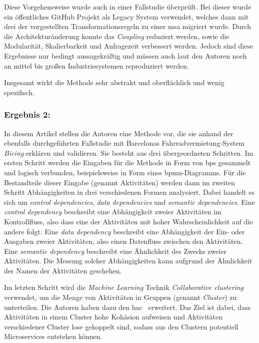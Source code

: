 Diese Vorgehensweise wurde auch in einer Fallstudie überprüft.
Bei dieser wurde ein öffentliches GitHub Projekt als Legacy System verwendet, welches dann mit drei der vorgestellten Transformationsregeln zu einer \gls{msa} migriert wurde.
Durch die Architekturänderung konnte das \emph{Coupling} reduziert werden, sowie die Modularität, Skalierbarkeit und Anfragezeit verbessert werden.
Jedoch sind diese Ergebnisse nur bedingt aussagekräftig und müssen auch laut den Autoren noch an mittel bis großen Industriesystemen reproduziert werden.

Insgesamt wirkt die Methode sehr abstrakt und oberflächlich und wenig spezifisch.

\subsubsection{Ergebnis 2:  \cite{arh-result-no-filter-3}}

In diesem Artikel stellen die Autoren eine Methode vor, die sie anhand der ebenfalls durchgeführten Fallstudie mit Barcelonas Fahrradvermietung-System \emph{Bicing} erklären und validieren.
Sie besteht aus drei übergeordneten Schritten.
Im ersten Schritt werden die Eingaben für die Methode in Form von \glspl{bp} gesammelt und logisch verbunden, beispielsweise in Form eines \gls{bpmn}-Diagramms.
Für die Bestandteile dieser Eingabe (genannt Aktivitäten) werden dann im zweiten Schritt Abhängigkeiten in drei verschiedenen Formen analysiert.
Dabei handelt es sich um \emph{control dependencies}, \emph{data dependencies} und \emph{semantic dependencies}.
Eine \emph{control dependency} beschreibt eine Abhängigkeit zweier Aktivitäten im Kontrollfluss, also dass eine der Aktivitäten mit hoher Wahrscheinlichkeit auf die andere folgt.
Eine \emph{data dependency} beschreibt eine Abhängigkeit der Ein- oder Ausgaben zweier Aktivitäten, also einen Datenfluss zwischen den Aktivitäten.
Eine \emph{semantic dependency} beschreibt eine Ähnlichkeit des Zwecks zweier Aktivitäten.
Die Messung solcher Abhängigkeiten kann aufgrund der Ähnlichkeit der Namen der Aktivitäten geschehen.

Im letzten Schritt wird die \emph{Machine Learning} Technik \emph{Collaborative clustering} verwendet, um die Menge von Aktivitäten in Gruppen (genannt \emph{Cluster}) zu unterteilen.
Die Autoren haben dazu den \gls{hac}~\cite{hierarchical-agglomerative-algorithm} erweitert.
Das Ziel ist dabei, dass Aktivitäten in einem Cluster hohe Kohäsion aufweisen und Aktivitäten verschiedener Cluster lose gekoppelt sind, sodass aus den Clustern potentiell Microservices entstehen können.

